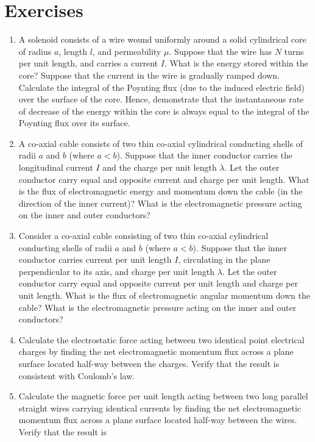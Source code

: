{\small
\section{Exercises}
\renewcommand{\theenumi}{8.\arabic{enumi}}
\begin{enumerate}
\item A solenoid consists of a wire wound uniformly around a solid cylindrical
core of radius $a$, length $l$, and permeability $\mu$. Suppose that the
wire has $N$ turns per unit length, and carries a current $I$. What is the energy stored within the core?
Suppose that the current
in the wire is gradually ramped down. Calculate the
integral of the Poynting flux (due to the induced electric field) over the surface of the core. Hence, demonstrate that the instantaneous rate of
decrease of the energy within the core is always equal to the integral of the  Poynting flux over its surface.
\item A co-axial cable consists of two thin co-axial cylindrical conducting
shells of radii $a$ and $b$ (where $a<b$). Suppose that the inner
conductor carries the longitudinal current $I$ and the charge per unit
length $\lambda$. Let the outer conductor carry equal and opposite
current and charge per unit length. What is the flux of electromagnetic energy
and momentum down the cable (in the direction of the inner current)?
What is the electromagnetic pressure acting on the inner and
outer conductors?
\item Consider a co-axial cable consisting of two thin co-axial cylindrical conducting shells of radii $a$ and
$b$ (where $a<b$). Suppose that the inner conductor carries  current per unit
length $I$, circulating in the plane perpendicular to its axis, and
charge per unit length $\lambda$. Let the outer conductor carry equal and
opposite current per unit length and charge per unit length. What is the
flux of electromagnetic angular momentum down the cable? What is the electromagnetic pressure acting on the inner and outer conductors?
\item Calculate the electrostatic force acting between two identical point electrical charges
by finding the net electromagnetic momentum flux across a
plane surface located half-way between the charges. Verify that the result
is consistent with Coulomb's law.
\item Calculate the magnetic force per unit length acting between two long
parallel straight wires carrying identical currents by finding the net electromagnetic momentum flux across a
plane surface located half-way between the wires. Verify that the result is

\end{enumerate}}
